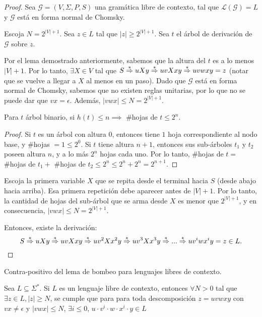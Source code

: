 \documentclass[a4paper,twoside,master.tex]{article}
\begin{document}
\begin{proof}
    Sea $\mathcal{G} = (V, \Sigma, P, S)$ una gramática libre de contexto, tal que $\mathcal{L}(\mathcal{G}) = L$ y $\mathcal{G}$ está en forma normal de Chomsky.

    Escoja $N = 2^{|V| + 1}$. Sea $z \in L$ tal que $|z| \ge 2^{|V| + 1}$. Sea $t$ el árbol de derivación de $\mathcal{G}$ sobre $z$.

    Por el lema demostrado anteriormente, sabemos que la altura del $t$ es a lo menos $|V| + 1$. Por lo tanto, $\exists X \in V$ tal que $S \derives* u X y \derives* u v X x y \derives* u v w x y = z$ (notar que se vuelve a llegar a $X$ al menos en un paso). Dado que $\mathcal{G}$ está en forma normal de Chomsky, sabemos que no existen reglas unitarias, por lo que no se puede dar que $v x = \epsilon$. Además, $|v w x| \le N = 2^{|V| + 1}$.

    \begin{lema}
        Para $t$ árbol binario, si $h(t) \le n \implies$ \#hojas de $t \le 2^n$.
    \end{lema}
    \begin{proof}
        Si $t$ es un árbol con altura $0$, entonces tiene $1$ hoja correspondiente al nodo base, y \#hojas $ = 1 \le 2^0$. Si $t$ tiene altura $n + 1$, entonces sus sub-árboles $t_1$ y $t_2$ poseen altura $n$, y a lo más $2^n$ hojas cada uno. Por lo tanto, \#hojas de $t = $ \#hojas de $t_1 + $ \#hojas de $t_2 \le 2^n \le 2^n + 2^n = 2^{n + 1}$.
    \end{proof}

    Escoja la primera variable $X$ que se repita desde el terminal hacia $S$ (desde abajo hacia arriba). Esa primera repetición debe aparecer antes de $|V| + 1$. Por lo tanto, la cantidad de hojas del sub-árbol que se arma desde $X$ es menor que $2^{|V| + 1}$, y en consecuencia, $|v w x| \le N = 2^{|V| + 1}$.

    Entonces, existe la derivación:
    \[
        S \derives* u X y \derives* u v X x y \derives* u v^2 X x^2 y \derives* u v^3 X x^3 y \derives* ... \derives* u v^i w x^i y = z \in L
        .
    \]
\end{proof}

Contra-positivo del lema de bombeo para lenguajes libres de contexto.

\begin{teorema}
    Sea $L \subseteq \Sigma^{*}$. Si $L$ es un lenguaje libre de contexto, entonces $\forall N > 0$ tal que $\exists z \in L, |z| \ge N$, se cumple que para para toda descomposición $z = u v w x y$ con $vx \neq \epsilon$ y $|vwx| \le N$, $\exists i \le 0$, $u \cdot v^i \cdot w \cdot x^i \cdot y \in L$
\end{teorema}
\end{document}

